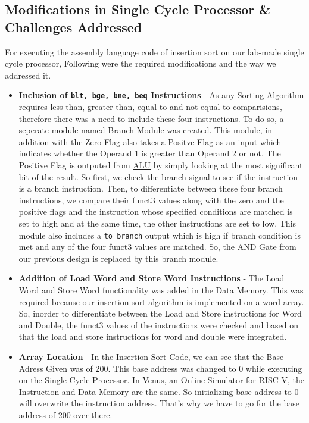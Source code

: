 \documentclass[12pt]{article}
\begin{document}
\subsection*{\Large Modifications in Single Cycle Processor \& Challenges Addressed}
For executing the assembly language code of insertion sort on our lab-made single cycle processor, Following were the required modifications and the way we addressed it.
\begin{itemize}
    \item \textbf{Inclusion of \texttt{blt, bge, bne, beq} Instructions} - As any Sorting Algorithm requires less than, greater than, equal to and not equal to comparisions, therefore there was a need to include these four instructions. To do so, a seperate module named \hyperref[branch_module]{Branch Module} was created. This module, in addition with the Zero Flag also takes a Positve Flag as an input which indicates whether the Operand 1 is greater than Operand 2 or not. The Positive Flag is outputed from \hyperref[alu]{ALU} by simply looking at the most significant bit of the result. So first, we check the branch signal to see if the instruction is a branch instruction. Then, to differentiate between these four branch instructions, we compare their funct3 values along with the zero and the positive flags and the instruction whose specified conditions are matched is set to high and at the same time, the other instructions are set to low. This module also includes a \texttt{to\_branch} output which is high if branch condition is met and any of the four funct3 values are matched. So, the AND Gate from our previous design is replaced by this branch module.
    \item \textbf{Addition of Load Word and Store Word Instructions} - The Load Word and Store Word functionality was added in the \hyperref[dmem]{Data Memory}. This was required because our insertion sort algorithm is implemented on a word array. So, inorder to differentiate between the Load and Store instructions for Word and Double, the funct3 values of the instructions were checked and based on that the load and store instructions for word and double were integrated.
    \item \textbf{Array Location} - In the \hyperref[ins_sort]{Insertion Sort Code}, we can see that the Base Adress Given was of 200. This base address was changed to 0 while executing on the Single Cycle Processor. In \hyperref[https://venus.kvakil.me]{Venus}, an Online Simulator for RISC-V, the Instruction and Data Memory are the same. So initializing base address to 0 will overwrite the instruction address. That's why we have to go for the base address of 200 over there.
\end{itemize}
\end{document}
